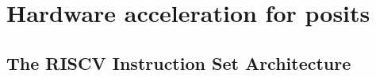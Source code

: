 \chapter{Hardware acceleration for posits}










\section{The RISCV Instruction Set Architecture}

